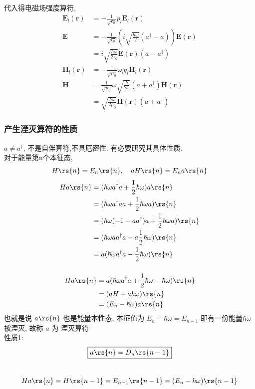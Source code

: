 \begin{frame} 
  代入得电磁场强度算符,
  \[ \begin{aligned}
    \mathbf{E}_l( \mathbf{r})& = - \frac{1}{\sqrt{ \epsilon_0}} p_l \mathbf{E}_l( \mathbf{r}) \\
    \mathbf{E}&= - \frac{1}{\sqrt{ \epsilon_0}} (i\sqrt{\frac{\hbar\omega}{2 }} (a^\dagger -a)) \mathbf{E}( \mathbf{r}) \\
    &= i \sqrt{\frac{\hbar\omega}{2 \epsilon_0}} \mathbf{E}( \mathbf{r}) (a - a^\dagger) \\ 
    \mathbf{H}_l( \mathbf{r}) &=- \frac{1}{\sqrt{ \mu_0}}  \omega_l q_l \mathbf{H}_l( \mathbf{r}) \\
    \mathbf{H} &= \frac{1}{\sqrt{ \mu_0}}  \omega \sqrt{\frac{\hbar}{2 \omega}} (a + a ^\dagger ) \mathbf{H}( \mathbf{r}) \\
    &= \sqrt{\frac{\hbar\omega}{2 \mu_0}} \mathbf{H}( \mathbf{r}) (a + a^\dagger)
 \end{aligned} 
\]
\end{frame}

\begin{frame}
  \frametitle{产生湮灭算符的性质}
  $ a \not =  a^\dagger $, 不是自伴算符,不具厄密性. 有必要研究其具体性质.\\ 
对于能量第n个本征态,  
  \[ H  \rs{n} = E_n  \rs{n}, \quad  aH  \rs{n} =E_n a \rs{n}\]
  \[
  \begin{aligned}
        H a \rs{n} &= ( \hbar \omega a ^\dagger a + \frac{1}{2}\hbar \omega )a \rs{n} \\ 
        &=  ( \hbar \omega  a ^\dagger a a  + \frac{1}{2}\hbar \omega a ) \rs{n} \\ 
        &=  ( \hbar \omega  (-1+a a ^\dagger )a + \frac{1}{2}\hbar \omega a ) \rs{n} \\ 
        &=  ( \hbar \omega  a a ^\dagger a -  a \frac{1}{2}\hbar \omega ) \rs{n} \\ 
        &=  a( \hbar \omega   a ^\dagger a -  \frac{1}{2}\hbar \omega ) \rs{n} 
  \end{aligned}
  \]
\end{frame}

\begin{frame}
  \frametitle{}
  \[ 
  \begin{aligned}
    H a \rs{n}  &=  a( \hbar \omega   a ^\dagger a +  \frac{1}{2}\hbar \omega  - \hbar \omega ) \rs{n} \\ 
        &=  (aH - a \hbar \omega ) \rs{n} \\ 
        &=  (E_n -  \hbar \omega ) a\rs{n} \\ 
  \end{aligned}
  \]
  也就是说 $a \rs{n} $ 也是能量本性态, 本征值为 $E_n -  \hbar \omega = E_{n-1} $ 即有一份能量$ \hbar \omega $ 被湮灭, 故称 $a$ 为 湮灭算符\\ 
  性质1: 
  \[ \boxed{a \rs{n}= D_n\rs{n-1}} \]
  ~~\\ 
  \[ H a \rs{n} =   H  \rs{n-1} = E_{n-1} \rs{n-1} = (E_{n}-\hbar \omega) \rs{n-1}\]
\end{frame}


